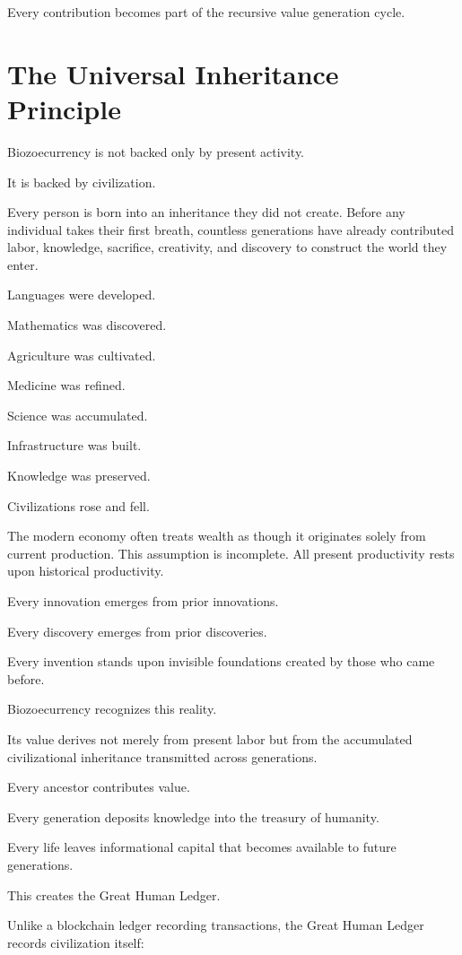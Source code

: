 ﻿\documentclass[12pt]{article}
\begin{document}
Every contribution becomes part of the recursive value generation cycle.

\section{The Universal Inheritance Principle}


Biozoecurrency is not backed only by present activity.

It is backed by civilization.

Every person is born into an inheritance they did not create. Before any individual takes their first breath, countless generations have already contributed labor, knowledge, sacrifice, creativity, and discovery to construct the world they enter.

Languages were developed.

Mathematics was discovered.

Agriculture was cultivated.

Medicine was refined.

Science was accumulated.

Infrastructure was built.

Knowledge was preserved.

Civilizations rose and fell.

The modern economy often treats wealth as though it originates solely from current production. This assumption is incomplete. All present productivity rests upon historical productivity.

Every innovation emerges from prior innovations.

Every discovery emerges from prior discoveries.

Every invention stands upon invisible foundations created by those who came before.

Biozoecurrency recognizes this reality.

Its value derives not merely from present labor but from the accumulated civilizational inheritance transmitted across generations.

Every ancestor contributes value.

Every generation deposits knowledge into the treasury of humanity.

Every life leaves informational capital that becomes available to future generations.

This creates the Great Human Ledger.

Unlike a blockchain ledger recording transactions, the Great Human Ledger records civilization itself:
\end{document}
